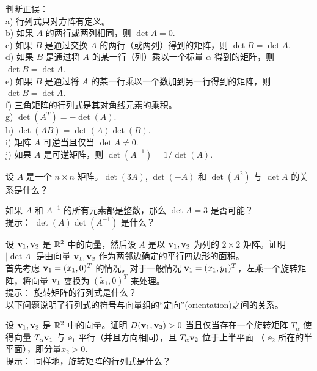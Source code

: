 \begin{problemset}
\item \label{ex:03-07-01} 判断正误：
\\
a) 行列式只对方阵有定义。
\\
b) 如果 $A$ 的两行或两列相同，则 $\det A = 0$.~
\\
c) 如果 $B$ 是通过交换 $A$ 的两行（或两列）得到的矩阵，则 $\det B = \det A$.~
\\
d) 如果 $B$ 是通过将 $A$ 的某一行（列）乘以一个标量 $\alpha$ 得到的矩阵，则 $\det B = \det A$.~
\\
e) 如果 $B$ 是通过将 $A$ 的某一行乘以一个数加到另一行得到的矩阵，则 $\det B = \det A$.~
\\
f) 三角矩阵的行列式是其对角线元素的乘积。
\\
g) $\det(A^T) = -\det(A)$.~
\\
h) $\det(AB) = \det(A)\det(B)$.~
\\
i) 矩阵 $A$ 可逆当且仅当 $\det A \neq 0$.~
\\
j) 如果 $A$ 是可逆矩阵，则 $\det(A^{-1}) = 1/\det(A)$.~
\item \label{ex:03-07-02} 设 $A$ 是一个 $n \times n$ 矩阵。$\det(3A)$, $\det(-A)$ 和 $\det(A^2)$ 与 $\det A$ 的关系是什么？
\item \label{ex:03-07-03} 如果 $A$ 和 $A^{-1}$ 的所有元素都是整数，那么 $\det A = 3$ 是否可能？
\\
{\heiti 提示：} $\det(A)\det(A^{-1})$ 是什么？
\item \label{ex:03-07-04} 设 $\mathbf{v}_1, \mathbf{v}_2$ 是 $\mathbb{R}^2$ 中的向量，然后设 $A$ 是以 $\mathbf{v}_1, \mathbf{v}_2$ 为列的 $2 \times 2$ 矩阵。证明 $|\det A|$ 是由向量 $\mathbf{v}_1, \mathbf{v}_2$ 作为两邻边确定的平行四边形的面积。
\\
首先考虑 $\mathbf{v}_1 = (x_1, 0)^T$ 的情况。对于一般情况 $\mathbf{v}_1 = (x_1, y_1)^T$，左乘一个旋转矩阵，将向量 $\mathbf{v}_1$ 变换为 $(\widetilde{x}_1, 0)^T$ 来处理。\\
{\heiti 提示：} 旋转矩阵的行列式是什么？
\\
以下问题说明了行列式的符号与向量组的“定向”(orientation)之间的关系。
\item \label{ex:03-07-05} 设 $\mathbf{v}_1, \mathbf{v}_2$ 是 $\mathbb{R}^2$ 中的向量。证明 $D(\mathbf{v}_1, \mathbf{v}_2) > 0$ 当且仅当存在一个旋转矩阵 $T_\alpha$ 使得向量 $T_\alpha \mathbf{v}_1$ 与 $\ee_1$ 平行（并且方向相同），且 $T_\alpha \mathbf{v}_2$ 位于上半平面 （ $\ee_2$ 所在的半平面），即分量$x_2 > 0$.~\\
{\heiti 提示：} 同样地，旋转矩阵的行列式是什么？


\end{problemset}





